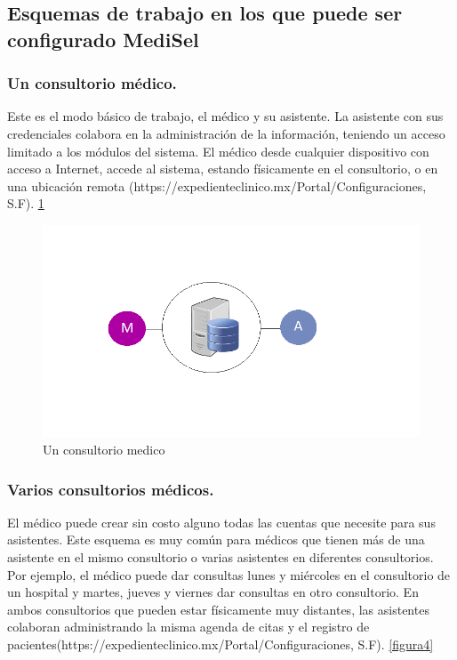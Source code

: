 \subsection{Esquemas de trabajo en los que puede ser configurado MediSel}

\subsubsection{Un consultorio médico.}
Este es el modo básico de trabajo, el médico y su asistente. La asistente con sus credenciales colabora en la administración de la información, teniendo un acceso limitado a los módulos del sistema. El médico desde cualquier dispositivo con acceso a Internet, accede al sistema, estando físicamente en el consultorio, o en una ubicación remota (https://expedienteclinico.mx/Portal/Configuraciones, S.F). \ref{figura3}
\begin{figure}[h]
  \label{figura3}
  \centering
  \includegraphics[scale=.35]{lib/assets/3}
  \caption{Un consultorio medico}
\end{figure}





\subsubsection{Varios consultorios médicos.}
El médico puede crear sin costo alguno todas las cuentas que necesite para sus asistentes. Este esquema es muy común para médicos que tienen más de una asistente en el mismo consultorio o varias asistentes en diferentes consultorios. Por ejemplo, el médico puede dar consultas lunes y miércoles en el consultorio de un hospital y martes, jueves y viernes dar consultas en otro consultorio. En ambos consultorios que pueden estar físicamente muy distantes, las asistentes colaboran administrando la misma agenda de citas y el registro de pacientes(https://expedienteclinico.mx/Portal/Configuraciones, S.F). \ref{figura4}

